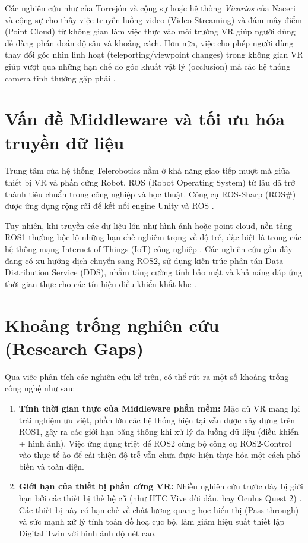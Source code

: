 Các nghiên cứu như của Torrejón và cộng sự \cite{torrejón2026teleoperation} hoặc hệ thống \textit{Vicarios} của Naceri và cộng sự \cite{naceri2021vicarios} cho thấy việc truyền luồng video (Video Streaming) và đám mây điểm (Point Cloud) từ không gian làm việc thực vào môi trường VR giúp người dùng dễ dàng phán đoán độ sâu và khoảng cách. Hơn nữa, việc cho phép người dùng thay đổi góc nhìn linh hoạt (teleporting/viewpoint changes) trong không gian VR giúp vượt qua những hạn chế do góc khuất vật lý (occlusion) mà các hệ thống camera tĩnh thường gặp phải \cite{naceri2021vicarios, su2022mixed}.

\section{Vấn đề Middleware và tối ưu hóa truyền dữ liệu}
Trung tâm của hệ thống Telerobotics nằm ở khả năng giao tiếp mượt mà giữa thiết bị VR và phần cứng Robot. ROS (Robot Operating System) từ lâu đã trở thành tiêu chuẩn trong công nghiệp và học thuật. Công cụ ROS-Sharp (ROS\#) được ứng dụng rộng rãi để kết nối engine Unity và ROS \cite{zhang2023research}. 

Tuy nhiên, khi truyền các dữ liệu lớn như hình ảnh hoặc point cloud, nền tảng ROS1 thường bộc lộ những hạn chế nghiêm trọng về độ trễ, đặc biệt là trong các hệ thống mạng Internet of Things (IoT) công nghiệp \cite{luu2025enhancing}. Các nghiên cứu gần đây đang có xu hướng dịch chuyển sang ROS2, sử dụng kiến trúc phân tán Data Distribution Service (DDS), nhằm tăng cường tính bảo mật và khả năng đáp ứng thời gian thực cho các tín hiệu điều khiển khắt khe \cite{singh2025comparative}.

\section{Khoảng trống nghiên cứu (Research Gaps)}
Qua việc phân tích các nghiên cứu kể trên, có thể rút ra một số khoảng trống công nghệ như sau:
\begin{enumerate}
    \item \textbf{Tính thời gian thực của Middleware phần mềm:} Mặc dù VR mang lại trải nghiệm ưu việt, phần lớn các hệ thống hiện tại \cite{hetrick2020comparing, chen2023comparing} vẫn được xây dựng trên ROS1, gây ra các giới hạn băng thông khi xử lý đa luồng dữ liệu (điều khiển + hình ảnh). Việc ứng dụng triệt để ROS2 cùng bộ công cụ ROS2-Control vào thực tế ảo để cải thiện độ trễ vẫn chưa được hiện thực hóa một cách phổ biến và toàn diện.
    \item \textbf{Giới hạn của thiết bị phần cứng VR:} Nhiều nghiên cứu trước đây bị giới hạn bởi các thiết bị thế hệ cũ (như HTC Vive đời đầu, hay Oculus Quest 2) \cite{hetrick2020comparing, chen2023comparing}. Các thiết bị này có hạn chế về chất lượng quang học hiển thị (Pass-through) và sức mạnh xử lý tính toán đồ hoạ cục bộ, làm giảm hiệu suất thiết lập Digital Twin với hình ảnh độ nét cao.
\end{enumerate}

